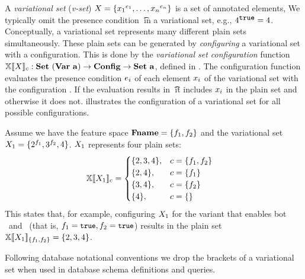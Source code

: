 A \emph{variational set} (\emph{v-set}) $\vset = \setDef {\annot [\dimMeta_1] {\elem_1},\ldots, \annot [\dimMeta_n] {\elem_n}}$ 
is a set of annotated elements, 
We typically omit the presence condition \t\ in a variational set,
e.g., $\annot [\t] 4 = 4$.
%
Conceptually, a variational set represents many different plain sets simultaneously.
These plain sets can be generated by \emph{configuring} a variational set with a configuration.
This is done by the \emph{variational set configuration} function
\ensuremath{\osetSem \vset: \vsetSet \to \confSet \to \psetSet}, defined in .
The configuration function evaluates the presence condition $\dimMeta_i$ of each 
element $\elem_i$ of the variational set with the configuration \config. 
If the evaluation results in \t\ it includes $\elem_i$ in the plain set and otherwise it
does not.  illustrates the configuration of a variational set for all
possible configurations. 

\begin{example}
\label{eg:vset-conf}
Assume we have the feature space $\fSet = \setDef {\A, \B}$ 
and the variational set $\vset_1 = \setDef {\annot [\A] 2, \annot [\B] 3, 4}$.
$\vset_1$ represents four plain sets:
\begin{alignat*}{1}
\osetSem {\vset_1} &=
\begin{cases}
  \setDef{2,3,4}, & \config = \setDef{\A,\B}\\
  \setDef{2,4}, & \config = \setDef{\A}\\
  \setDef{3,4}, & \config = \setDef{\B}\\
  \setDef{4}, & \config = \setDef { }
\end{cases}
\end{alignat*}
This states that, for example, configuring $\vset_1$ for the variant that enables 
bot \A\ and \B\ (that is, \ensuremath{\A = \t, \B = \t}) results in the plain set
\ensuremath{ \osetSem [\setDef {\A, \B}] {\vset_1} = \setDef {2,3,4} }.
\end{example}

%
Following database notational conventions
we drop the brackets of a variational set when used in database
schema definitions and queries.

